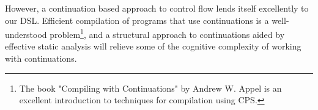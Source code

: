 However, a continuation based approach to control flow lends itself excellently to our \ac{DSL}. Efficient compilation of programs that use continuations is a well-understood problem\footnote{The book "Compiling with Continuations" by Andrew W. Appel \cite{Appel1992} is an excellent introduction to techniques for compilation using \acf{CPS}.}, and a structural approach to continuations aided by effective static analysis will relieve some of the cognitive complexity of working with continuations.


